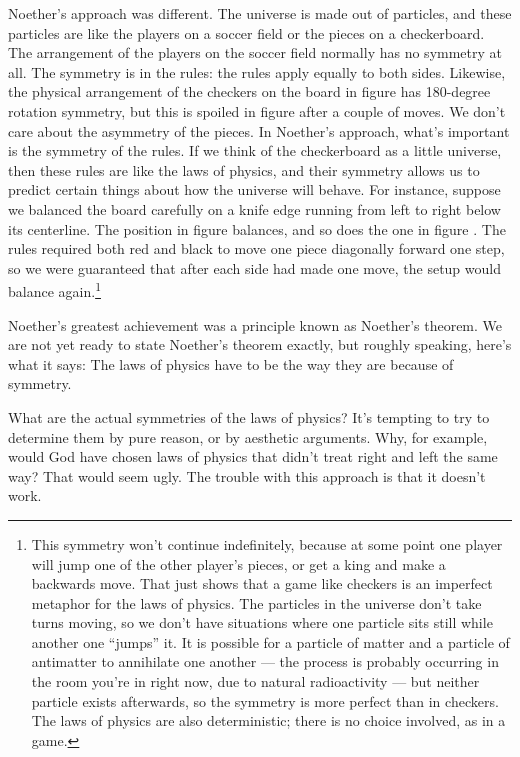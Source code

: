 Noether's approach was different. The universe is made out of particles, and
these particles are like the players on a soccer field
or the pieces on a checkerboard. The arrangement of the players on the
soccer field normally has no symmetry at all. The symmetry is in the rules:
the rules apply equally to both sides. Likewise, the physical arrangement
of the checkers on the board in figure  has
180-degree rotation symmetry, but this is spoiled in figure 
after a couple of moves. We don't care about the asymmetry of the pieces.
In Noether's approach, what's important is the symmetry of the rules.
If we think of the checkerboard as a little universe, then these rules are like
the laws of physics, and their symmetry allows us to predict certain things
about how the universe will behave. For instance, suppose we balanced the board
carefully on a knife edge running from left to right below its centerline. The
position in figure  balances, and so does the one
in figure . The rules required both red and black to
move one piece diagonally forward one step, so we were guaranteed that after
each side had made one move, the setup would balance again.\footnote{This
symmetry won't continue indefinitely, because at some point one player will
jump one of the other player's pieces, or get a king and make a backwards
move. That just shows that a game like checkers is an imperfect metaphor for
the laws of physics. The particles in the universe don't take turns moving,
so we don't have situations where one particle sits still while another
one ``jumps'' it. It is possible for a particle of matter and a particle of
antimatter to annihilate one another --- the process is probably occurring in
the room you're in right now, due to natural radioactivity --- but neither particle
exists afterwards, so the symmetry is more perfect than in checkers.
The laws of physics are also deterministic; there is
no choice involved, as in a game.}

Noether's greatest achievement was a principle known as Noether's theorem.
We are not yet ready to state Noether's theorem exactly, but roughly speaking,
here's what it says: The laws of physics have to be the way they are because
of symmetry.

What are the actual symmetries of the laws of physics? It's tempting to try to
determine them by pure reason, or by aesthetic arguments. Why, for example, would
God have chosen laws of physics that didn't treat right and left the same way? That
would seem ugly. The trouble with this approach is that it doesn't work.

